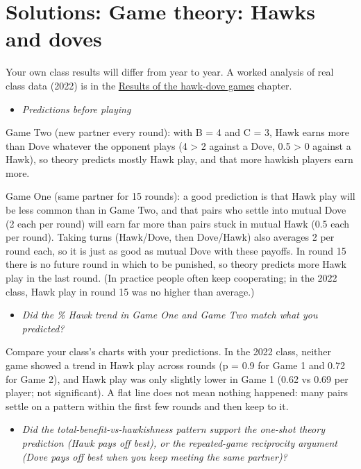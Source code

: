 \documentclass[
  a4paper]{book}
\providecommand{\tightlist}{%
  \setlength{\itemsep}{0pt}\setlength{\parskip}{0pt}}
\begin{document}
\section{Solutions: Game theory: Hawks and doves}\label{solutions-game-theory-hawks-and-doves}

Your own class results will differ from year to year. A worked analysis of real class data (2022) is in the \hyperref[results-of-the-hawk-dove-games]{Results of the hawk-dove games} chapter.

\begin{itemize}
\tightlist
\item
  \emph{Predictions before playing}
\end{itemize}

Game Two (new partner every round): with B = 4 and C = 3, Hawk earns more than Dove whatever the opponent plays (4 \textgreater{} 2 against a Dove, 0.5 \textgreater{} 0 against a Hawk), so theory predicts mostly Hawk play, and that more hawkish players earn more.

Game One (same partner for 15 rounds): a good prediction is that Hawk play will be less common than in Game Two, and that pairs who settle into mutual Dove (2 each per round) will earn far more than pairs stuck in mutual Hawk (0.5 each per round). Taking turns (Hawk/Dove, then Dove/Hawk) also averages 2 per round each, so it is just as good as mutual Dove with these payoffs. In round 15 there is no future round in which to be punished, so theory predicts more Hawk play in the last round. (In practice people often keep cooperating; in the 2022 class, Hawk play in round 15 was no higher than average.)

\begin{itemize}
\tightlist
\item
  \emph{Did the \% Hawk trend in Game One and Game Two match what you predicted?}
\end{itemize}

Compare your class's charts with your predictions. In the 2022 class, neither game showed a trend in Hawk play across rounds (p = 0.9 for Game 1 and 0.72 for Game 2), and Hawk play was only slightly lower in Game 1 (0.62 vs 0.69 per player; not significant). A flat line does not mean nothing happened: many pairs settle on a pattern within the first few rounds and then keep to it.

\begin{itemize}
\tightlist
\item
  \emph{Did the total-benefit-vs-hawkishness pattern support the one-shot theory prediction (Hawk pays off best), or the repeated-game reciprocity argument (Dove pays off best when you keep meeting the same partner)?}
\end{itemize}
\end{document}
